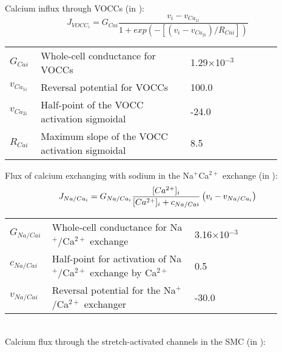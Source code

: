 Calcium influx through VOCCs (in \uMs): 
\begin{equation} \label{eq:JVOCCi}
J_{VOCC_{i}} = G_{Cai} \frac{v_{i}-v_{Ca_{1i}}}     {1+ exp(-\left[ \left(  v_{i}-v_{Ca_{2i}}\right) /R_{Cai}      \right] )}
\end{equation}
\begin{table}[h!]
\centering
\begin{tabular}{ p{0.09\linewidth}  >{\footnotesize} p{0.5\linewidth}  >{\footnotesize} p{0.27\linewidth} >{\footnotesize} p{0.03\linewidth} }
\hline
$G_{Cai}$      	& Whole-cell conductance for VOCCs	 					& 1.29$\times$10$^{-3}$  \uMpmVs					& \cite{Koenigsberger2006} \\
$v_{Ca_{1i}}$   & Reversal potential for VOCCs	 						& 100.0 \mV							& \cite{Koenigsberger2006} \\
$v_{Ca_{2i}}$  	& Half-point of the VOCC activation sigmoidal		 	& -24.0 \mV							& \cite{Koenigsberger2006} \\
$R_{Cai}$      	& Maximum slope of the VOCC	activation sigmoidal		& 8.5 \mV							& \cite{Koenigsberger2006} \\
\hline
\end{tabular}
\label{tab:JVOCCi}
\end{table}
\newpage
Flux of calcium exchanging with sodium in the Na$^{+}$Ca$^{2+}$ exchange (in \uMs): 
\begin{equation} \label{eq:JNaCai}
J_{Na/Ca_{i}} = G_{Na/Ca_{i}} \frac{[Ca^{2+}]_{i}}     {[Ca^{2+}]_{i} + c_{Na/Cai}} \left( v_{i}-v_{Na/Ca_{i}} \right)
\end{equation}
%
\begin{table}[h!]
\centering
\begin{tabular}{ p{0.09\linewidth}  >{\footnotesize} p{0.5\linewidth}  >{\footnotesize} p{0.27\linewidth} >{\footnotesize} p{0.03\linewidth} }
\hline
$G_{Na/Cai}$   	& Whole-cell conductance for Na$^{+}$/Ca$^{2+}$ exchange			 		 & 3.16$\times$10$^{-3}$ \uMpmVs	& \cite{Koenigsberger2006} \\
$c_{Na/Cai}$   	& Half-point for activation of Na$^{+}$/Ca$^{2+}$ exchange by Ca$^{2+}$		 & 0.5 \uM			& \cite{Koenigsberger2006} \\
$v_{Na/Cai}$   	& Reversal potential for the Na$^{+}$/Ca$^{2+}$ exchanger					 & -30.0 \mV		& \cite{Koenigsberger2006} \\
\hline
\end{tabular}
\label{tab:JNaCai}
\end{table}
\\
%
Calcium flux through the stretch-activated channels in the SMC (in \uMs): 
